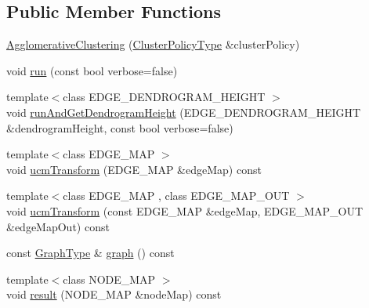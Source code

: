 \subsection*{Public Member Functions}
\begin{DoxyCompactItemize}
\item 
\hyperlink{classnifty_1_1graph_1_1agglo_1_1AgglomerativeClustering_a4c1ae55dc3568df3f2e0ffe9e34963df}{Agglomerative\+Clustering} (\hyperlink{classnifty_1_1graph_1_1agglo_1_1AgglomerativeClustering_a3a678ecd37725f2c0f8ec56857768034}{Cluster\+Policy\+Type} \&cluster\+Policy)
\item 
void \hyperlink{classnifty_1_1graph_1_1agglo_1_1AgglomerativeClustering_a163e9745cbaf077ea1e65750bd33eadb}{run} (const bool verbose=false)
\item 
{\footnotesize template$<$class E\+D\+G\+E\+\_\+\+D\+E\+N\+D\+R\+O\+G\+R\+A\+M\+\_\+\+H\+E\+I\+G\+H\+T $>$ }\\void \hyperlink{classnifty_1_1graph_1_1agglo_1_1AgglomerativeClustering_adf2c89066a4796c32e722c7244b37f3c}{run\+And\+Get\+Dendrogram\+Height} (E\+D\+G\+E\+\_\+\+D\+E\+N\+D\+R\+O\+G\+R\+A\+M\+\_\+\+H\+E\+I\+G\+H\+T \&dendrogram\+Height, const bool verbose=false)
\item 
{\footnotesize template$<$class E\+D\+G\+E\+\_\+\+M\+A\+P $>$ }\\void \hyperlink{classnifty_1_1graph_1_1agglo_1_1AgglomerativeClustering_a34c94614c65bceb4adb7e405b15b7773}{ucm\+Transform} (E\+D\+G\+E\+\_\+\+M\+A\+P \&edge\+Map) const 
\item 
{\footnotesize template$<$class E\+D\+G\+E\+\_\+\+M\+A\+P , class E\+D\+G\+E\+\_\+\+M\+A\+P\+\_\+\+O\+U\+T $>$ }\\void \hyperlink{classnifty_1_1graph_1_1agglo_1_1AgglomerativeClustering_a020daa26353c691b12e1173aa34c25d3}{ucm\+Transform} (const E\+D\+G\+E\+\_\+\+M\+A\+P \&edge\+Map, E\+D\+G\+E\+\_\+\+M\+A\+P\+\_\+\+O\+U\+T \&edge\+Map\+Out) const 
\item 
const \hyperlink{classnifty_1_1graph_1_1agglo_1_1AgglomerativeClustering_a0c735105592b55c036be76e3d7fc735f}{Graph\+Type} \& \hyperlink{classnifty_1_1graph_1_1agglo_1_1AgglomerativeClustering_aa1dca426965fb41a39ee75f9dace3b67}{graph} () const 
\item 
{\footnotesize template$<$class N\+O\+D\+E\+\_\+\+M\+A\+P $>$ }\\void \hyperlink{classnifty_1_1graph_1_1agglo_1_1AgglomerativeClustering_af6c65243b35df8c69e777261cbb88115}{result} (N\+O\+D\+E\+\_\+\+M\+A\+P \&node\+Map) const 
\end{DoxyCompactItemize}


